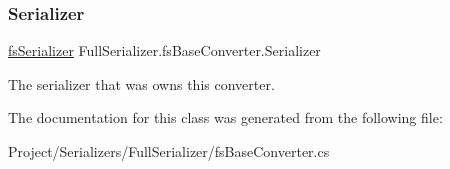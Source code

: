\subsubsection{\texorpdfstring{Serializer}{Serializer}}
{\footnotesize\ttfamily \hyperlink{class_full_serializer_1_1fs_serializer}{fs\+Serializer} Full\+Serializer.\+fs\+Base\+Converter.\+Serializer}



The serializer that was owns this converter. 



The documentation for this class was generated from the following file\+:\begin{DoxyCompactItemize}
\item 
Project/\+Serializers/\+Full\+Serializer/fs\+Base\+Converter.\+cs\end{DoxyCompactItemize}
